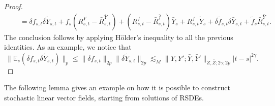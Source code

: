 \documentclass[11pt,a4paper]{article}
\newcommand{\E}{\mathbb{E}}
\theoremstyle{plain}
\begin{document}
\begin{proof}
\begin{equation*}
\begin{aligned}
            &\quad = \delta f_{s,t} \delta\tilde{Y}_{s,t} + f_s (R^Y_{s,t}-\bar{R}^{\bar{Y}}_{s,t}) + (R^f_{s,t} - \bar{R}^{\bar{f}}_{s,t}) \bar{Y}_s + R^f_{s,t} \tilde{Y}_s + \delta \tilde{f}_{s,t} \delta \bar{Y}_{s,t} + \tilde{f}_s \bar{R}^{\bar{Y}}_{s,t}.
        \end{aligned}
    \end{equation*}
    The conclusion follows by applying H\"older's inequality to all the previous identities. As an example, we notice that \begin{equation*}
        \|\E_s(\delta f_{s,t} \delta\tilde{Y}_{s,t})\|_p \le \|\delta f_{s,t}\|_{2p} \|\delta\tilde{Y}_{s,t}\|_{2p} \lesssim_M \|Y,Y';\bar{Y},\bar{Y}'\|_{Z,\bar{Z};2\gamma;2p} |t-s|^{2\gamma}.
    \end{equation*}
\end{proof}



The following lemma gives an example on how it is possible to construct stochastic linear vector fields, starting from solutions of RSDEs.
\end{document}
